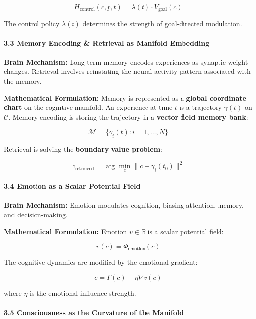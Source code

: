 \documentclass[
  11pt,
  a4paper,
]{article}
\begin{document}
\[H_{\text{control}}(c, p, t) = \lambda(t) \cdot V_{\text{goal}}(c)\]

The control policy \(\lambda(t)\) determines the strength of
goal-directed modulation.

\paragraph{3.3 Memory Encoding \& Retrieval as Manifold
Embedding}\label{memory-encoding-retrieval-as-manifold-embedding}

\textbf{Brain Mechanism:} Long-term memory encodes experiences as
synaptic weight changes. Retrieval involves reinstating the neural
activity pattern associated with the memory.

\textbf{Mathematical Formulation:} Memory is represented as a
\textbf{global coordinate chart} on the cognitive manifold. An
experience at time \(t\) is a trajectory \(\gamma(t)\) on
\(\mathcal{C}\). Memory encoding is storing the trajectory in a
\textbf{vector field memory bank}:

\[\mathcal{M} = \{\gamma_i(t) : i = 1, \dots, N\}\]

Retrieval is solving the \textbf{boundary value problem}:

\[c_{\text{retrieved}} = \arg\min_{c} \|c - \gamma_i(t_0)\|^2\]

\paragraph{3.4 Emotion as a Scalar Potential
Field}\label{emotion-as-a-scalar-potential-field}

\textbf{Brain Mechanism:} Emotion modulates cognition, biasing
attention, memory, and decision-making.

\textbf{Mathematical Formulation:} Emotion \(v \in \mathbb{R}\) is a
scalar potential field:

\[v(c) = \Phi_{\text{emotion}}(c)\]

The cognitive dynamics are modified by the emotional gradient:

\[\dot{c} = F(c) - \eta \nabla v(c)\]

where \(\eta\) is the emotional influence strength.

\paragraph{3.5 Consciousness as the Curvature of the
Manifold}\label{consciousness-as-the-curvature-of-the-manifold}
\end{document}
